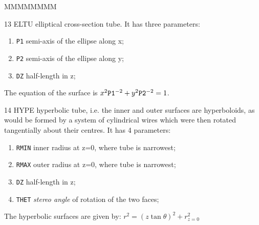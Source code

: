 \begin{DLtt}{MMMMMMMM}
\item[13 ELTU] elliptical cross-section tube. It has three parameters:
\begin{enumerate}
\item {\tt P1} semi-axis of the ellipse along x;
\item {\tt P2} semi-axis of the ellipse along y;
\item {\tt DZ} half-length in z;
\end{enumerate}

The equation of the surface is $x^2\mbox{\tt P1}^{-2} + y^2
\mbox{\tt P2}^{-2} = 1$.

\item[14 HYPE] hyperbolic  tube, i.e. the inner and  outer surfaces are
hyperboloids, as would be formed by a system of cylindrical
wires  which were  then  rotated  tangentially about  their
centres. It has  4  parameters:
\begin{enumerate}
\item {\tt RMIN} inner radius at z=0, where tube is narrowest;
\item {\tt RMAX} outer radius at z=0, where tube is narrowest;
\item {\tt DZ} half-length in z;
\item {\tt THET} {\it stereo  angle} of rotation of the two faces;
\end{enumerate}

The hyperbolic  surfaces are  given by: $r^2 = (z \tan \theta )^2
+r_{z=0}^2$


\end{DLtt}
